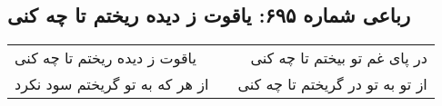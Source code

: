 \begin{center}
\section*{رباعی شماره ۶۹۵: یاقوت ز دیده ریختم تا چه کنی}
\label{sec:sh695}
\begin{longtable}{l p{0.5cm} r}
یاقوت ز دیده ریختم تا چه کنی
&&
در پای غم تو بیختم تا چه کنی
\\
از هر که به تو گریختم سود نکرد
&&
از تو به تو در گریختم تا چه کنی
\\
\end{longtable}
\end{center}
